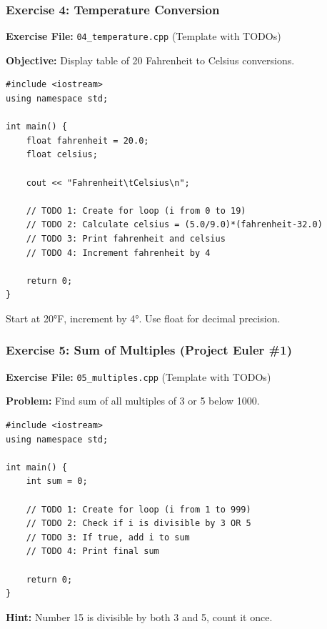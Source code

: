 \documentclass{beamer}
\begin{document}
\begin{frame}[fragile]
\frametitle{Exercise 4: Temperature Conversion}
\textbf{Exercise File:} \texttt{04\_temperature.cpp} (Template with TODOs)

\textbf{Objective:} Display table of 20 Fahrenheit to Celsius conversions.\pause

\begin{verbatim}
#include <iostream>
using namespace std;

int main() {
    float fahrenheit = 20.0;
    float celsius;
    
    cout << "Fahrenheit\tCelsius\n";
    
    // TODO 1: Create for loop (i from 0 to 19)
    // TODO 2: Calculate celsius = (5.0/9.0)*(fahrenheit-32.0)
    // TODO 3: Print fahrenheit and celsius
    // TODO 4: Increment fahrenheit by 4
    
    return 0;
}
\end{verbatim}

Start at 20°F, increment by 4°. Use float for decimal precision.
\end{frame}

\begin{frame}[fragile]
\frametitle{Exercise 5: Sum of Multiples (Project Euler \#1)}
\textbf{Exercise File:} \texttt{05\_multiples.cpp} (Template with TODOs)

\textbf{Problem:} Find sum of all multiples of 3 or 5 below 1000.\pause

\begin{verbatim}
#include <iostream>
using namespace std;

int main() {
    int sum = 0;
    
    // TODO 1: Create for loop (i from 1 to 999)
    // TODO 2: Check if i is divisible by 3 OR 5
    // TODO 3: If true, add i to sum
    // TODO 4: Print final sum
    
    return 0;
}
\end{verbatim}

\textbf{Hint:} Number 15 is divisible by both 3 and 5, count it once.
\end{frame}
\end{document}
